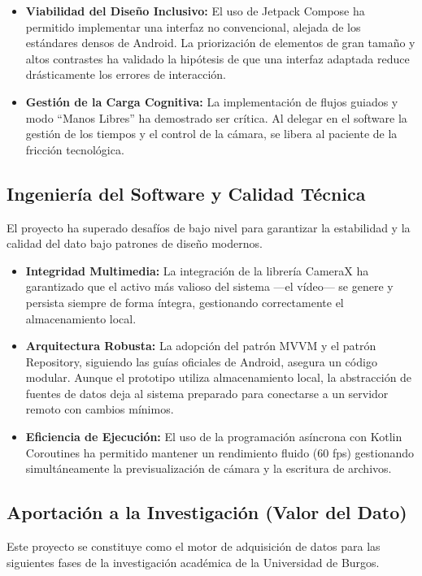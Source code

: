 \begin{itemize}
    \item \textbf{Viabilidad del Diseño Inclusivo:} El uso de Jetpack Compose ha permitido implementar una interfaz no convencional, alejada de los estándares densos de Android. La priorización de elementos de gran tamaño y altos contrastes ha validado la hipótesis de que una interfaz adaptada reduce drásticamente los errores de interacción.
    \item \textbf{Gestión de la Carga Cognitiva:} La implementación de flujos guiados y modo ``Manos Libres'' ha demostrado ser crítica. Al delegar en el software la gestión de los tiempos y el control de la cámara, se libera al paciente de la fricción tecnológica.
\end{itemize}

\subsection{Ingeniería del Software y Calidad Técnica}
El proyecto ha superado desafíos de bajo nivel para garantizar la estabilidad y la calidad del dato bajo patrones de diseño modernos. 

\begin{itemize}
    \item \textbf{Integridad Multimedia:} La integración de la librería CameraX ha garantizado que el activo más valioso del sistema —el vídeo— se genere y persista siempre de forma íntegra, gestionando correctamente el almacenamiento local.
    \item \textbf{Arquitectura Robusta:} La adopción del patrón MVVM y el patrón Repository, siguiendo las guías oficiales de Android, asegura un código modular. Aunque el prototipo utiliza almacenamiento local, la abstracción de fuentes de datos deja al sistema preparado para conectarse a un servidor remoto con cambios mínimos.
    \item \textbf{Eficiencia de Ejecución:} El uso de la programación asíncrona con Kotlin Coroutines ha permitido mantener un rendimiento fluido (60 fps) gestionando simultáneamente la previsualización de cámara y la escritura de archivos.
\end{itemize}

\subsection{Aportación a la Investigación (Valor del Dato)}
Este proyecto se constituye como el motor de adquisición de datos para las siguientes fases de la investigación académica de la Universidad de Burgos.


